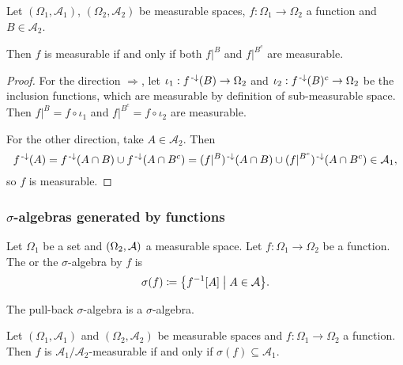 \begin{lemma} \label{measurabilityCodomainPartition}
Let $(\Omega_1, \mathcal{A}_1)$, $(\Omega_2, \mathcal{A}_2)$ be measurable spaces, $f: \Omega_1 \to \Omega_2$ a function and $B\in \mathcal{A}_2$.

Then $f$ is measurable \textup{if and only if} both $f|^B$ and $f|^{B^c}$ are measurable.
\end{lemma}
\begin{proof}
For the direction $\Rightarrow$, let $\iota_1: f^{\text{\hspace{0.15em}-}\downarrow}(B)\to \Omega_2$ and $\iota_2: f^{\text{\hspace{0.15em}-}\downarrow}(B)^c\to \Omega_2$ be the inclusion functions, which are measurable by definition of sub-measurable space. Then $f|^B = f\circ \iota_1$ and $f|^{B^c} = f\circ \iota_2$ are measurable.

For the other direction, take $A\in \mathcal{A}_2$. Then
\[ f^{{\text{\hspace{0.15em}-}\downarrow}}(A) = f^{\text{\hspace{0.15em}-}\downarrow}(A\cap B) \cup f^{\text{\hspace{0.15em}-}\downarrow}(A\cap B^c) = (f|^B)^{\text{\hspace{0.15em}-}\downarrow}(A\cap B) \cup (f|^{B^c})^{\text{\hspace{0.15em}-}\downarrow}(A\cap B^c) \in \mathcal{A}_1, \]
so $f$ is measurable.
\end{proof}

\subsubsection{$\sigma$-algebras generated by functions}
\begin{definition}
Let $\Omega_1$ be a set and $\sSet{\Omega_2, \mathcal{A}}$ a measurable space. Let $f: \Omega_1\to \Omega_2$ be a function. The  or the $\sigma$-algebra  by $f$ is
\[ \sigma(f) \defeq \setbuilder{f^{-1}[A]}{A\in \mathcal{A}}. \]
\end{definition}

The pull-back $\sigma$-algebra is a $\sigma$-algebra.

\begin{lemma}
Let $(\Omega_1, \mathcal{A}_1)$ and $(\Omega_2, \mathcal{A}_2)$ be measurable spaces and $f: \Omega_1\to \Omega_2$ a function. Then $f$ is $\mathcal{A}_1/\mathcal{A}_2$-measurable \textup{if and only if} $\sigma(f) \subseteq \mathcal{A}_1$.
\end{lemma}

